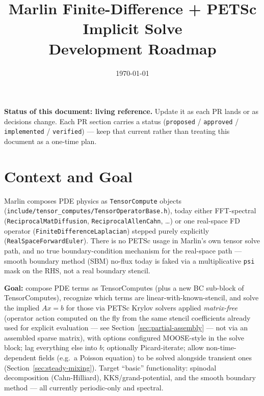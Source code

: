 \documentclass[11pt]{article}
\title{\textcolor{marlinblue}{\Huge Marlin Finite-Difference + PETSc\\[2pt] Implicit Solve}\\[8pt]
\Large Development Roadmap}
\author{}
\date{\today}
\begin{document}
\maketitle

\begin{tcolorbox}[colback=lightgray, colframe=marlinblue, boxrule=0.6pt, arc=1mm]
\textbf{Status of this document: living reference.} Update it as each PR
lands or as decisions change. Each PR section carries a status
(\texttt{proposed} / \texttt{approved} / \texttt{implemented} / \texttt{verified}) ---
keep that current rather than treating this document as a one-time plan.
\end{tcolorbox}

\tableofcontents
\vspace{1em}

\section{Context and Goal}

Marlin composes PDE physics as \texttt{TensorCompute} objects
(\texttt{include/tensor\_computes/TensorOperatorBase.h}), today either
FFT-spectral (\texttt{ReciprocalMatDiffusion}, \texttt{ReciprocalAllenCahn}, \ldots)
or one real-space FD operator (\texttt{FiniteDifferenceLaplacian}) stepped
purely explicitly (\texttt{RealSpaceForwardEuler}). There is no PETSc usage in
Marlin's own tensor solve path, and no true boundary-condition mechanism for
the real-space path --- smooth boundary method (SBM) no-flux today is faked
via a multiplicative \texttt{psi} mask on the RHS, not a real boundary
stencil.

\textbf{Goal:} compose PDE terms as TensorComputes (plus a new BC sub-block of
TensorComputes), recognize which terms are linear-with-known-stencil, and
solve the implied $Ax=b$ for those via PETSc Krylov solvers applied
\textit{matrix-free} (operator action computed on the fly from the same
stencil coefficients already used for explicit evaluation --- see
Section~\ref{sec:partial-assembly} --- not via an assembled sparse matrix),
with options configured MOOSE-style in the solve block; lag everything else
into $b$; optionally Picard-iterate; allow non-time-dependent fields (e.g.\ a
Poisson equation) to be solved alongside transient ones
(Section~\ref{sec:steady-mixing}). Target ``basic'' functionality: spinodal
decomposition (Cahn-Hilliard), KKS/grand-potential, and the smooth boundary
method --- all currently periodic-only and spectral.
\end{document}
